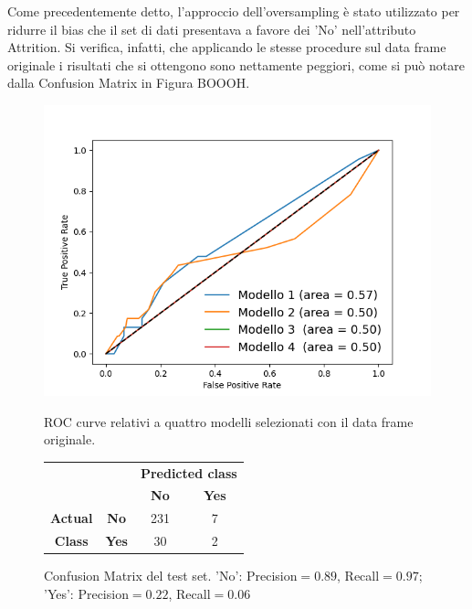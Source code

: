 \documentclass[a4paper,9pt]{article}
\begin{document}
Come precedentemente detto, l'approccio dell'oversampling è stato utilizzato per ridurre il bias che il set di dati presentava a favore dei 'No' nell'attributo Attrition. Si verifica, infatti, che applicando le stesse procedure sul data frame originale i risultati che si ottengono sono nettamente peggiori, come si può notare dalla Confusion Matrix in Figura BOOOH.


\begin{figure}[H]
  \begin{minipage}{.45\textwidth}
    \centering
    \includegraphics[width=\textwidth]{ROC_CURVEsenzaYes.png}
    \caption{ROC curve relativi a quattro modelli selezionati con il data frame originale.}
  \end{minipage}
  \centering
  \begin{minipage}{.45\textwidth}
       \centering
\begin{tabular}{cc|cc}
\toprule
&\bfseries      & \multicolumn{2}{c}{\bfseries Predicted class} \\
& & \bfseries No & \bfseries Yes \\
\midrule
\bfseries Actual&\bfseries No  & 231 & 7  \\
\bfseries Class &\bfseries Yes & 30 & 2  \\
\bottomrule
\end{tabular}
\caption{Confusion Matrix del test set. 'No': Precision$=0.89$, Recall$=0.97$; 'Yes': Precision$=0.22$, Recall$=0.06$}
  \end{minipage}

  \end{figure}
\end{document}
